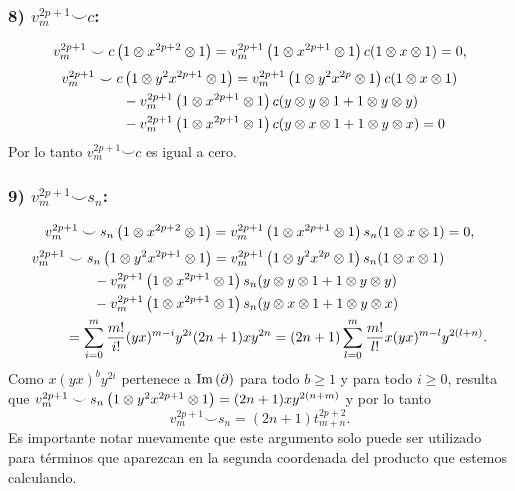 \documentclass[fleqn,../tesis.tex]{subfiles}
\begin{document}
\subsubsection{8) $v_m^{2p + 1} \smile c$:}
\begin{align*}
	v_m^{2p + 1} \smile c\left(1 \otimes x^{2p + 2} \otimes 1\right)
		= v_m^{2p + 1}\left(1 \otimes x^{2p + 1} \otimes 1\right)c(1 \otimes x \otimes 1) = 0,
\end{align*}
\begin{align*}
	v_m^{2p + 1}& \smile c\left(1 \otimes y^2x^{2p + 1} \otimes 1\right)
		= v_m^{2p + 1}\left(1 \otimes y^2 x^{2p} \otimes 1\right)c(1 \otimes x \otimes 1)\\
		&\qquad- v_m^{2p + 1}\left(1 \otimes x^{2p + 1} \otimes 1\right)c(y \otimes y \otimes 1 + 1 \otimes y \otimes y)\\
		&\qquad -v_m^{2p + 1}\left(1 \otimes x^{2p + 1} \otimes 1\right)c(y \otimes x \otimes 1 + 1 \otimes y \otimes x) = 0
\end{align*}
Por lo tanto $v_m^{2p + 1} \smile c$ es igual a cero.
\subsubsection{9) $v_m^{2p + 1} \smile s_n$:}
\begin{align*}
	v_m^{2p + 1} \smile s_n\left(1 \otimes x^{2p + 2} \otimes 1\right)
		= v_m^{2p + 1}\left(1 \otimes x^{2p + 1} \otimes 1\right)s_n(1 \otimes x \otimes 1) = 0,
\end{align*}	
\begin{align*}
	v_m^{2p + 1}& \smile s_n\left(1 \otimes y^2x^{2p + 1} \otimes 1\right)
		= v_m^{2p + 1}\left(1 \otimes y^2 x^{2p} \otimes 1\right)s_n(1 \otimes x \otimes 1)\\
	&\qquad- v_m^{2p + 1}\left(1 \otimes x^{2p + 1} \otimes 1\right)s_n(y \otimes y \otimes 1 + 1 \otimes y \otimes y)\\
	&\qquad -v_m^{2p + 1}\left(1 \otimes x^{2p + 1} \otimes 1\right)s_n(y \otimes x \otimes 1 + 1 \otimes y \otimes x)\\
	&= \sum_{i = 0}^{m}\frac{m!}{i!}(yx)^{m - i}y^{2i}(2n + 1)xy^{2n}
		=(2n + 1)\sum_{l = 0}^{m}\frac{m!}{l!}x(yx)^{m - l}y^{2(l + n)}.
\end{align*}
Como $x(yx)^{b}y^{2i}$ pertenece a $\operatorname{Im}\left(\partial\right)$ para todo $b\geq 1$ y para todo
$i \geq 0$, resulta que $v_m^{2p + 1}\smile s_n\left(1 \otimes y^2x^{2p + 1} \otimes 1\right) = (2n + 1)xy^{2(n + m)}$
y por lo tanto \[v_m^{2p + 1}\smile s_n =(2n + 1)t_{m + n}^{2p + 2}.\]
Es importante notar nuevamente que este argumento solo puede ser utilizado para términos que aparezcan en la segunda coordenada
del producto que estemos calculando.
\end{document}
